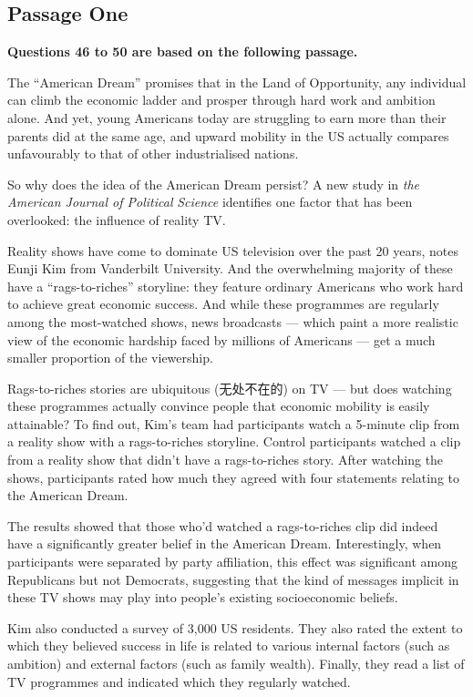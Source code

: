 \documentclass[UTF8,11pt]{ctexart}
\begin{document}
\subsection*{\textbf{Passage One}}


\textbf{Questions 46 to 50 are based on the following passage.}


The “American Dream” promises that in the Land of Opportunity, any individual can climb the economic ladder and prosper through hard work and ambition alone. And yet, young Americans today are struggling to earn more than their parents did at the same age, and upward mobility in the US actually compares unfavourably to that of other industrialised nations.


So why does the idea of the American Dream persist? A new study in \textit{the American Journal of Political} \textit{Science} identifies one factor that has been overlooked: the influence of reality TV.


Reality shows have come to dominate US television over the past 20 years, notes Eunji Kim from Vanderbilt University. And the overwhelming majority of these have a “rags-to-riches” storyline: they feature ordinary Americans who work hard to achieve great economic success. And while these programmes are regularly among the most-watched shows, news broadcasts — which paint a more realistic view of the economic hardship faced by millions of Americans — get a much smaller proportion of the viewership.


Rags-to-riches stories are ubiquitous (无处不在的) on TV — but does watching these programmes actually convince people that economic mobility is easily attainable? To find out, Kim’s team had participants watch a 5-minute clip from a reality show with a rags-to-riches storyline. Control participants watched a clip from a reality show that didn’t have a rags-to-riches story. After watching the shows, participants rated how much they agreed with four statements relating to the American Dream.


The results showed that those who’d watched a rags-to-riches clip did indeed have a significantly greater belief in the American Dream. Interestingly, when participants were separated by party affiliation, this effect was significant among Republicans but not Democrats, suggesting that the kind of messages implicit in these TV shows may play into people’s existing socioeconomic beliefs.


Kim also conducted a survey of 3,000 US residents. They also rated the extent to which they believed success in life is related to various internal factors (such as ambition) and external factors (such as family wealth). Finally, they read a list of TV programmes and indicated which they regularly watched.
\end{document}
